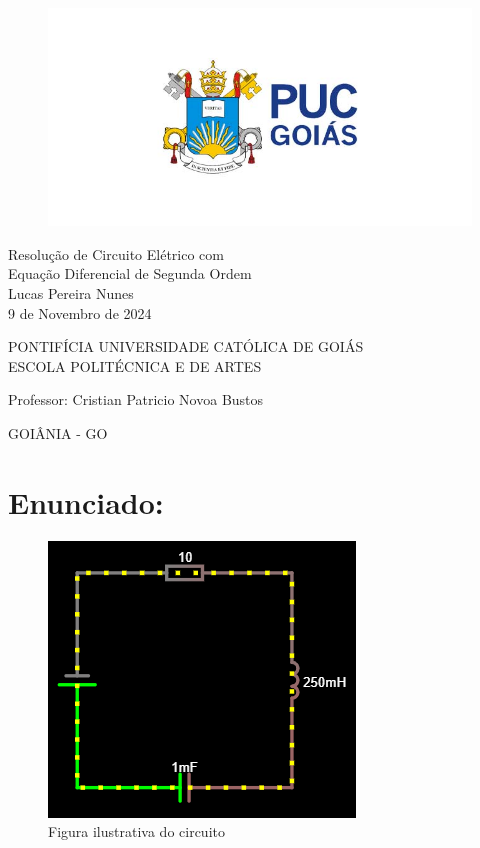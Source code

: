 \documentclass{abntex2}
\begin{document}
\begin{figure}[h]
    \centering
    \includegraphics[width=0.5\linewidth]{vestibular-puc-goias-2021-2.jpg}
\end{figure}

\vspace{1cm}

\begin{center}
    {\huge Resolução de Circuito Elétrico com\\ Equação Diferencial de Segunda Ordem}\\
    \vspace{0.1cm}
    {Lucas Pereira Nunes}\\
    {9 de Novembro de 2024}\\
\end{center}

\vspace{5cm}

\begin{center}
            \Large{PONTIFÍCIA UNIVERSIDADE CATÓLICA DE GOIÁS\\
ESCOLA POLITÉCNICA E DE ARTES}

\vspace{4.2cm}
{\large Professor: Cristian Patricio Novoa Bustos}

\vfill
{GOIÂNIA - GO}
    \end{center}

\newpage
\textual
\setcounter{page}{1}

\section*{\textbf{Enunciado:\\}}

\begin{figure}[h]
    \centering
    \includegraphics[width=0.5\linewidth]{image.png}
    \caption{Figura ilustrativa do circuito}
    \label{fig:enter-label}
\end{figure}
\end{document}
